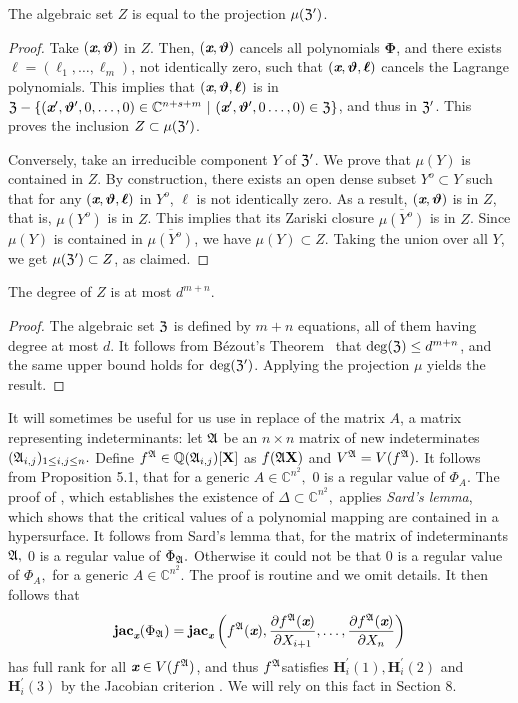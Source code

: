 \documentclass[sigconf]{acmart}
\def\thetab{\bm{\vartheta}}
\def\xb{\textit{\textbf{x}}}
\def\C{\mathbb{C}}
\def\jac{ \textbf{jac}}
\def\dt{s}
\def\pa{\partial}
\def\A{\frak{A}}
\begin{document}
\begin{lemma}  
  The algebraic set $Z$ is equal to the projection $\mu(\frak{Z}')$.
\end{lemma}
\begin{proof}
  Take $(\xb,\thetab)$ in $Z$. Then, $(\xb,\thetab)$ cancels all
  polynomials $\bm \Phi$, and there exists $\bm
  \ell=(\ell_1,\dots,\ell_m)$, not identically zero, such that
  $(\xb,\thetab,\bm \ell)$ cancels the Lagrange polynomials. This
  implies that $(\xb,\thetab,\bm \ell)$ is in $\frak{Z} -
  \{(\xb',\thetab',0,\hdots,0) \in
  \C^{n+\dt+m}~|~(\xb',\thetab',0\hdots,0) \in
  \frak{Z}\}$, and thus in $\frak{Z}'$. This proves the inclusion
  $Z \subset \mu(\frak{Z}')$.

  Conversely, take an irreducible component $Y$ of $\frak Z'$. We prove 
  that $\mu(Y)$ is contained in $Z$.
  By construction, there exists an open dense subset $Y^o \subset Y$
  such that for any $(\xb,\thetab,\bm \ell)$ in $Y^o$, $\bm \ell$ is
  not identically zero. As a result, $(\xb,\thetab)$ is in $Z$, that
  is, $\mu(Y^o)$ is in $Z$. This implies that its Zariski closure
  $\overline{\mu(Y^o)}$ is in $Z$. Since $\mu(Y)$ is contained in
  $\overline{\mu(Y^o)}$, we have $\mu(Y) \subset Z$. Taking 
  the union over all $Y$, we get $\mu(\frak Z') \subset Z$, as claimed.
\end{proof}
%
\begin{corollary} 
  The degree of $Z$ is at most $d^{m+n}.$
\end{corollary}
\begin{proof}
  The algebraic set $\frak Z$ is defined by $m+n$ equations, all of
  them having degree at most $d$. It follows from B\'ezout's
  Theorem~\cite{H} that $\deg(\frak{Z}) \leq d^{m+n}$, and the same
  upper bound holds for $\deg(\frak{Z}')$. Applying the projection
  $\mu$ yields the result.
\end{proof}



It will sometimes be useful for us use in replace of the matrix $A$, a
matrix representing indeterminants: let $\A$ be an $n \times n$ matrix
of new indeterminates $(\A_{i,j})_{1 \leq i , j \leq n}.$ Define
$f^{\A} \in \mathbb{Q}(\A_{i,j})[\textbf{X}]$ as $f(\A\textbf{X})$ and
$V^\A=V(f^\A).$ It follows from Proposition 5.1, that for a generic $A
\in \C^{n^2},$ $0$ is a regular value of $\Phi_{A}$.  The proof of
\cite[Theorem B.3]{TWT}, which establishes the existence of $\Delta
\subset \C^{n^2},$ applies \textit{Sard's lemma}, which shows that the
critical values of a polynomial mapping are contained in a
hypersurface. It follows from Sard's lemma that, for the matrix of
indeterminants $\A,$ $0$ is a regular value of $\Phi_{\A}.$ Otherwise
it could not be that $0$ is a regular value of $\Phi_A,$ for a generic
$A\in \C^{n^2}.$ The proof is routine and we omit details. It then
follows that
\[
\jac_{\xb}(\Phi_{\A}) = \jac_{\xb}\left(f^{\A}(\xb),\frac{\pa f^{\A}(\xb)}{\pa X_{i+1}},\hdots,\frac{\pa f^{\A}(\xb)}{\pa X_n}\right)
\]
has full rank for all $\xb \in V(f^{\A})$, and thus $f^{\A}$satisfies
$\textbf{H}_i^{'}(1),\textbf{H}_i^{'}(2)$ and $\textbf{H}_i^{'}(3)$ by
the Jacobian criterion \cite[Theorem 16.19]{ECA}. We will rely on this
fact in Section 8.
\end{document}
